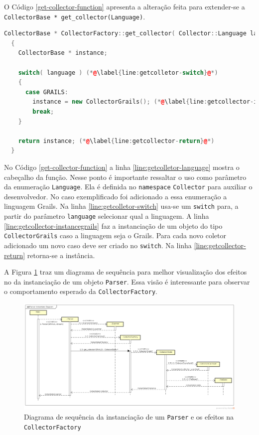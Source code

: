 O Código \ref{get-collector-function} apresenta a alteração feita para extender-se
a \lstinline|CollectorBase * get_collector(Language)|.

\begin{lstlisting}[language=C++, label=get-collector-function, caption=Implementação e extensão da \lstinline{get_collector(Language)}]
CollectorBase * CollectorFactory::get_collector( Collector::Language language ) (*@\label{line:getcolletor-language}@*)
  {
    CollectorBase * instance;

    switch( language ) (*@\label{line:getcolletor-switch}@*)
    {
      case GRAILS:
        instance = new CollectorGrails(); (*@\label{line:getcollector-instancegrails}@*)
        break;
    }

    return instance; (*@\label{line:getcollector-return}@*)
  }
\end{lstlisting}

No Código \ref{get-collector-function} a linha \ref{line:getcolletor-language}
mostra o cabeçalho da função. Nesse ponto é importante ressaltar o uso como
parâmetro da enumeração \lstinline|Language|. Ela é definida no \lstinline|namespace|
\lstinline|Collector| para auxiliar o desenvolvedor. No caso exemplificado foi
adicionado a essa enumeração a linguagem \textsf{Grails}. Na linha
\ref{line:getcolletor-switch} usa-se um \lstinline|switch| para, a partir do parâmetro
\lstinline|language| selecionar qual a linguagem. A linha
\ref{line:getcollector-instancegrails} faz a instanciação de um objeto do tipo
\lstinline|CollectorGrails| caso a linguagem seja o \textsf{Grails}. Para cada novo
coletor adicionado um novo caso deve ser criado no \lstinline|switch|. Na linha
\ref{line:getcollector-return} retorna-se a instância.

A Figura \ref{parser-instance-sequence-diagram} traz um diagrama de sequência para melhor
visualização dos efeitos no \scarefault da instanciação de um objeto \lstinline|Parser|.
Essa visão é interessante para observar o comportamento esperado da
\lstinline|CollectorFactory|.
\begin{landscape}
\begin{figure}[h]
  \centering
    \includegraphics[width=1.5\textwidth]{figuras/parser-instance-sequence-diagram.png}
    \caption{Diagrama de sequência da instanciação de um \lstinline|Parser| e os efeitos na \lstinline|CollectorFactory|}
    \label{parser-instance-sequence-diagram}
\end{figure}
\FloatBarrier
\end{landscape}

